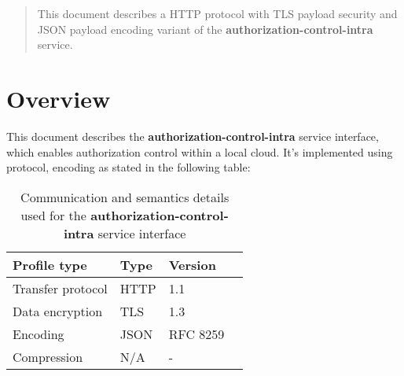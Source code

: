 \documentclass[a4paper]{arrowhead}
\begin{document}
\ArrowheadDate{\today}
\ArrowheadSetup

\begin{center}
  \vspace*{1cm}
  \huge{\arrowtitle}

  \vspace*{0.2cm}
  \LARGE{\arrowtype}
  \vspace*{1cm}
\end{center}

  \vspace*{\fill}


  \vspace*{1cm}
  \vspace*{\fill}

  \begin{abstract}
    This document describes a HTTP protocol with TLS payload
    security and JSON payload encoding variant of the \textbf{authorization-control-intra} service.
  \end{abstract}
  \vspace*{1cm}

\newpage

\tableofcontents
\newpage

\section{Overview}
\label{sec:overview}

This document describes the \textbf{authorization-control-intra} service interface, which enables authorization control within a local cloud. It's implemented using protocol, encoding as stated in the following table:

\begin{table}[ht!]
  \centering
  \begin{tabular}{|l|l|l|l|}
    \rowcolor{gray!33} Profile type & Type & Version \\ \hline
    Transfer protocol & HTTP & 1.1 \\ \hline
    Data encryption & TLS & 1.3 \\ \hline
    Encoding & JSON & RFC 8259 \cite{rfc8259} \\ \hline
    Compression & N/A & - \\ \hline
  \end{tabular}
  \caption{Communication and semantics details used for the \textbf{authorization-control-intra}
    service interface}
  \label{tab:comunication_semantics_profile}
\end{table}
\end{document}
